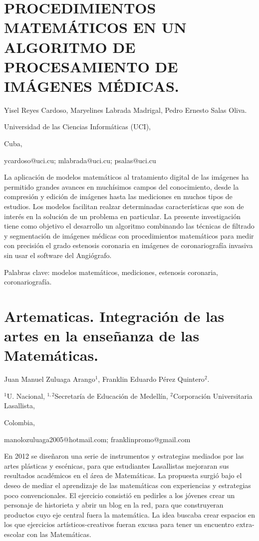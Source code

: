 \section{PROCEDIMIENTOS MATEMÁTICOS EN UN ALGORITMO DE PROCESAMIENTO DE IMÁGENES
MÉDICAS. }

\begin{datos}

Yisel Reyes Cardoso, Maryelines Labrada Madrigal, Pedro Ernesto Salas
Oliva.

Universidad de las Ciencias Informáticas (UCI),

Cuba,

ycardoso@uci.cu; mlabrada@uci.cu; psalas@uci.cu

\end{datos}

La aplicación de modelos matemáticos al tratamiento digital de las
imágenes ha permitido grandes avances en muchísimos campos del conocimiento,
desde la compresión y edición de imágenes hasta las mediciones en
muchos tipos de estudios. Los modelos facilitan realzar determinadas
características que son de interés en la solución de un problema en
particular. La presente investigación tiene como objetivo el desarrollo
un algoritmo combinando las técnicas de filtrado y segmentación de
imágenes médicas con procedimientos matemáticos para medir con precisión
el grado estenosis coronaria en imágenes de coronariografía invasiva
sin usar el software del Angiógrafo.

Palabras clave: modelos matemáticos, mediciones, estenosis coronaria,
coronariografía.


\section{Artematicas. Integración de las artes en la enseñanza de las Matemáticas.}

\begin{datos}

Juan Manuel Zuluaga Arango$^{1}$, Franklin Eduardo Pérez Quintero$^{2}$.

$^{1}$U. Nacional, $^{1,2}$Secretaría de Educación de Medellín,
$^{2}$Corporación Universitaria Lasallista,

Colombia,

manolozuluaga2005@hotmail.com; franklinpromo@gmail.com

\end{datos}

En 2012 se diseñaron una serie de instrumentos y estrategias mediados
por las artes plásticas y escénicas, para que estudiantes Lasallistas
mejoraran sus resultados académicos en el área de Matemáticas. La
propuesta surgió bajo el deseo de mediar el aprendizaje de las matemáticas
con experiencias y estrategias poco convencionales. El ejercicio consistió
en pedirles a los jóvenes crear un personaje de historieta y abrir
un blog en la red, para que construyeran productos cuyo eje central
fuera la matemática. La idea buscaba crear espacios en los que ejercicios
artísticos-creativos fueran excusa para tener un encuentro extra-escolar
con las Matemáticas.


